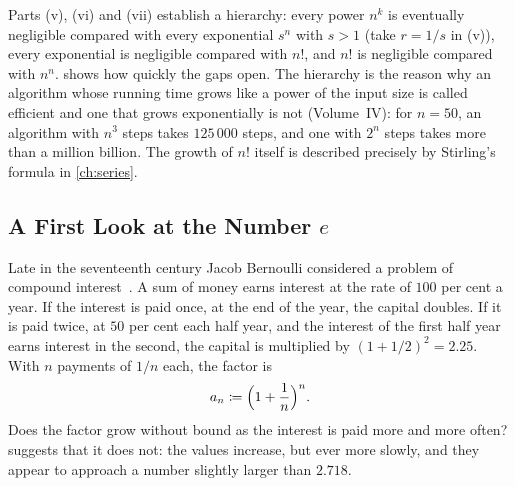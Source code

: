 Parts (v), (vi) and (vii) establish a hierarchy: every power $n^k$ is eventually negligible compared with every exponential $s^n$ with $s>1$ (take $r=1/s$ in (v)), every exponential is negligible compared with $n!$, and $n!$ is negligible compared with $n^n$.  shows how quickly the gaps open. The hierarchy is the reason why an algorithm whose running time grows like a power of the input size is called efficient and one that grows exponentially is not (Volume~IV): for $n=50$, an algorithm with $n^3$ steps takes $125\,000$ steps, and one with $2^n$ steps takes more than a million billion. The growth of $n!$ itself is described precisely by Stirling's formula in \cref{ch:series}.

\begin{table}
\end{table}

\subsection{A First Look at the Number \texorpdfstring{$e$}{e}}

Late in the seventeenth century Jacob Bernoulli considered a problem of compound interest~\cite{maor1994}. A sum of money earns interest at the rate of $100$ per cent a year. If the interest is paid once, at the end of the year, the capital doubles. If it is paid twice, at $50$ per cent each half year, and the interest of the first half year earns interest in the second, the capital is multiplied by $(1+1/2)^2=2.25$. With $n$ payments of $1/n$ each, the factor is
\[
a_n\coloneqq\Bigl(1+\frac1n\Bigr)^n .
\]
Does the factor grow without bound as the interest is paid more and more often?  suggests that it does not: the values increase, but ever more slowly, and they appear to approach a number slightly larger than $2.718$.

